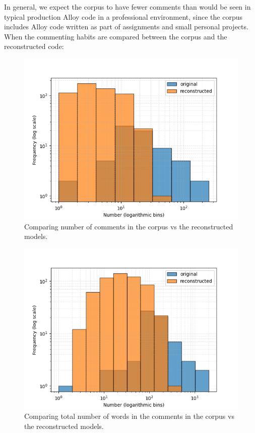 \documentclass[conference]{IEEEtran}
\begin{document}
In general, we expect the corpus to have fewer comments than would be seen in typical production Alloy code in a professional environment, since the corpus includes Alloy code written as part of assignments and small personal projects. When the commenting habits are compared between the corpus and the reconstructed code:

\begin{figure}[htbp]
    \centerline{\includegraphics[width=\linewidth]{"./Comparing number of comments in the corpus vs the reconstructed models.png"}}
    \caption{Comparing number of comments in the corpus vs the reconstructed models.}
    \label{fig}
    \end{figure}
    
    
    \begin{figure}[htbp]
    \centerline{\includegraphics[width=\linewidth]{"./Comparing total number of words in the comments in the corpus vs the reconstructed models.png"}}
    \caption{Comparing total number of words in the comments in the corpus vs the reconstructed models.}
    \label{fig}
    \end{figure}
\end{document}
